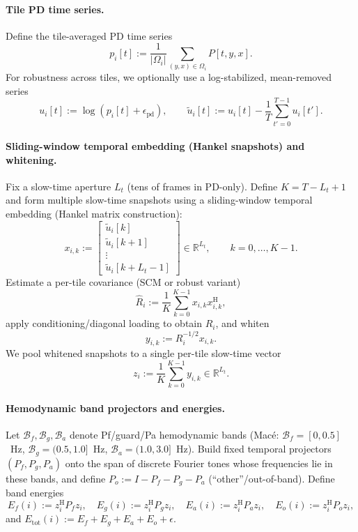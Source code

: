 \documentclass[11pt]{article}
\newcommand{\R}{\mathbb{R}}
\newcommand{\wh}{\widehat}
\newcommand{\Hh}{^{\mathrm{H}}}
\newcommand{\Pf}{P_f}
\newcommand{\Pa}{P_a}
\newcommand{\Po}{P_o}
\newcommand{\Pg}{P_g}
\newcommand{\Cf}{\mathcal{B}_f}
\newcommand{\Ca}{\mathcal{B}_a}
\newcommand{\Cg}{\mathcal{B}_g}
\begin{document}
\paragraph{Tile PD time series.}
Define the tile-averaged PD time series
\[
p_i[t] := \frac{1}{|\Omega_i|}\sum_{(y,x)\in\Omega_i} P[t,y,x].
\]
For robustness across tiles, we optionally use a log-stabilized, mean-removed series
\[
u_i[t] := \log(p_i[t]+\epsilon_{\mathrm{pd}}),\qquad
\tilde u_i[t] := u_i[t]-\frac{1}{T}\sum_{t'=0}^{T-1} u_i[t'].
\]

\paragraph{Sliding-window temporal embedding (Hankel snapshots) and whitening.}
Fix a slow-time aperture $L_t$ (tens of frames in PD-only). Define $K=T-L_t+1$ and form multiple slow-time snapshots using a sliding-window temporal embedding (Hankel matrix construction):
\[
x_{i,k} :=
\begin{bmatrix}
\tilde u_i[k]\\
\tilde u_i[k+1]\\
\vdots\\
\tilde u_i[k+L_t-1]
\end{bmatrix}\in\R^{L_t},\qquad k=0,\dots,K-1.
\]
Estimate a per-tile covariance (SCM or robust variant)
\[
\wh R_i := \frac{1}{K}\sum_{k=0}^{K-1} x_{i,k}x_{i,k}\Hh,
\]
apply conditioning/diagonal loading to obtain $R_i$, and whiten
\[
y_{i,k} := R_i^{-1/2}x_{i,k}.
\]
We pool whitened snapshots to a single per-tile slow-time vector
\[
z_i := \frac{1}{K}\sum_{k=0}^{K-1} y_{i,k}\in\R^{L_t}.
\]

\paragraph{Hemodynamic band projectors and energies.}
Let $\Cf,\Cg,\Ca$ denote Pf/guard/Pa hemodynamic bands (Mac{\'e}: $\Cf=[0,0.5]$~Hz, $\Cg=(0.5,1.0]$~Hz, $\Ca=(1.0,3.0]$~Hz). Build fixed temporal projectors $(\Pf,\Pg,\Pa)$ onto the span of discrete Fourier tones whose frequencies lie in these bands, and define $\Po := I-\Pf-\Pg-\Pa$ (``other''/out-of-band). Define band energies
\[
E_f(i) := z_i\Hh \Pf z_i,\quad
E_g(i) := z_i\Hh \Pg z_i,\quad
E_a(i) := z_i\Hh \Pa z_i,\quad
E_o(i) := z_i\Hh \Po z_i,
\]
and $E_{\mathrm{tot}}(i) := E_f+E_g+E_a+E_o+\epsilon$.
\end{document}
